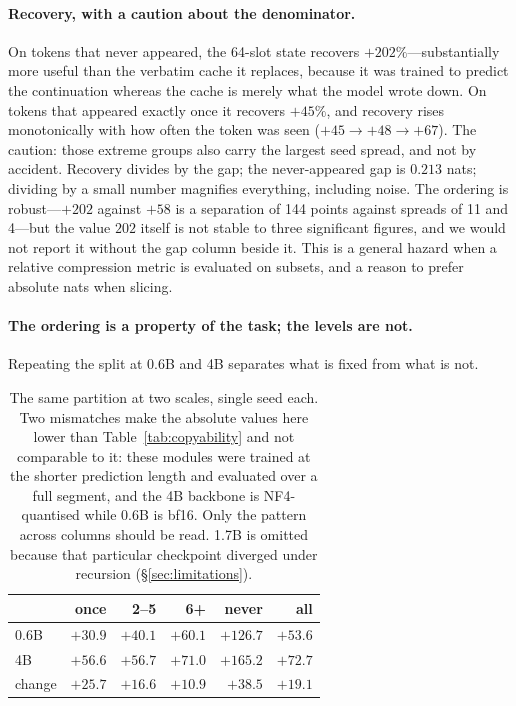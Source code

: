 \documentclass[11pt]{article}
\begin{document}
\paragraph{Recovery, with a caution about the denominator.}
On tokens that never appeared, the 64-slot state recovers $+202\%$---substantially
more useful than the verbatim cache it replaces, because it was trained to
predict the continuation whereas the cache is merely what the model wrote down.
On tokens that appeared exactly once it recovers $+45\%$, and recovery rises
monotonically with how often the token was seen ($+45 \to +48 \to +67$). The
caution: those extreme groups also carry the largest seed spread, and not by
accident. Recovery divides by the gap; the never-appeared gap is $0.213$ nats;
dividing by a small number magnifies everything, including noise. The ordering is
robust---$+202$ against $+58$ is a separation of 144 points against spreads of 11
and 4---but the value $202$ itself is not stable to three significant figures,
and we would not report it without the gap column beside it. This is a general
hazard when a relative compression metric is evaluated on subsets, and a reason
to prefer absolute nats when slicing.

\paragraph{The ordering is a property of the task; the levels are not.}
Repeating the split at 0.6B and 4B separates what is fixed from what is not.

\begin{table}[ht]
\centering
\small
\begin{tabular}{lrrrrr}
\toprule
 & once & 2--5 & 6+ & never & all \\
\midrule
0.6B & $+30.9$ & $+40.1$ & $+60.1$ & $+126.7$ & $+53.6$ \\
4B   & $+56.6$ & $+56.7$ & $+71.0$ & $+165.2$ & $+72.7$ \\
\midrule
change & $\mathbf{+25.7}$ & $+16.6$ & $\mathbf{+10.9}$ & $+38.5$ & $+19.1$ \\
\bottomrule
\end{tabular}
\caption{The same partition at two scales, single seed each. Two mismatches make
the absolute values here lower than Table~\ref{tab:copyability} and not
comparable to it: these modules were trained at the shorter prediction length
and evaluated over a full segment, and the 4B backbone is NF4-quantised while
0.6B is bf16. Only the pattern across columns should be read. 1.7B is omitted
because that particular checkpoint diverged under recursion
(\S\ref{sec:limitations}).}
\label{tab:copyscale}
\end{table}
\end{document}
